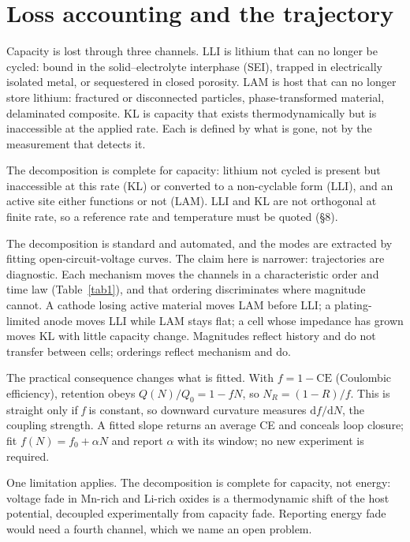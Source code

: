 \documentclass[AMA,Times2COL]{WileyNJDv5}
\begin{document}
\section{Loss accounting and the trajectory}\label{sec:Lossaccountingandthetrajectory}
Capacity is lost through three channels. LLI is lithium that can no longer be cycled: bound in the solid--electrolyte interphase (SEI), trapped in electrically isolated metal, or sequestered in closed porosity. LAM is host that can no longer store lithium: fractured or disconnected particles, phase-transformed material, delaminated composite. KL is capacity that exists thermodynamically but is inaccessible at the applied rate. Each is defined by what is gone, not by the measurement that detects it.\cite{birkl2017degradation}

The decomposition is complete for capacity: lithium not cycled is present but inaccessible at this rate (KL) or converted to a non-cyclable form (LLI), and an active site either functions or not (LAM). LLI and KL are not orthogonal at finite rate, so a reference rate and temperature must be quoted (\S8).

The decomposition is standard and automated,\cite{mndezcorbacho2024dest} and the modes are extracted by fitting open-circuit-voltage curves.\cite{dubarry2012synthesize} The claim here is narrower: trajectories are diagnostic. Each mechanism moves the channels in a characteristic order and time law (Table~\ref{tab1}), and that ordering discriminates where magnitude cannot. A cathode losing active material moves LAM before LLI; a plating-limited anode moves LLI while LAM stays flat; a cell whose impedance has grown moves KL with little capacity change. Magnitudes reflect history and do not transfer between cells; orderings reflect mechanism and do.

The practical consequence changes what is fitted. With $f = 1 - \mathrm{CE}$ (Coulombic efficiency), retention obeys $Q(N)/Q_0 = 1 - fN$, so $N_R = (1 - R)/f$. This is straight only if \emph{f} is constant, so downward curvature measures $\mathrm{d}f/\mathrm{d}N$, the coupling strength. A fitted slope returns an average CE and conceals loop closure;\cite{smith2010precision} fit $f(N) = f_0 + \alpha N$ and report $\alpha$ with its window; no new experiment is required.

One limitation applies. The decomposition is complete for capacity, not energy: voltage fade in Mn-rich and Li-rich oxides is a thermodynamic shift of the host potential, decoupled experimentally from capacity fade.\cite{pang2025resolving} Reporting energy fade would need a fourth channel, which we name an open problem.
\end{document}
